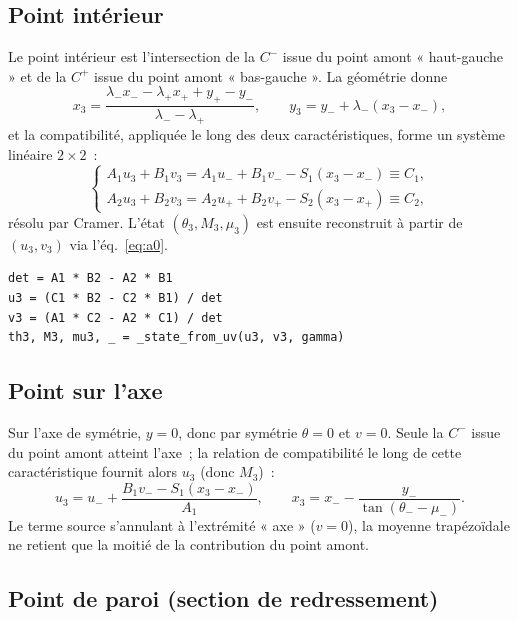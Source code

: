 \documentclass[11pt,a4paper]{article}
\begin{document}
\subsection{Point intérieur}

Le point intérieur est l'intersection de la $C^{-}$ issue du point amont
« haut-gauche » et de la $C^{+}$ issue du point amont « bas-gauche ». La
géométrie donne
\begin{equation}
  x_3 = \frac{\lambda_{-} x_{-} - \lambda_{+} x_{+} + y_{+} - y_{-}}
             {\lambda_{-} - \lambda_{+}},
  \qquad
  y_3 = y_{-} + \lambda_{-}(x_3 - x_{-}),
\end{equation}
et la compatibilité, appliquée le long des deux caractéristiques, forme un
système linéaire $2\times2$~:
\begin{equation}
  \begin{cases}
    A_1 u_3 + B_1 v_3 = A_1 u_{-} + B_1 v_{-} - S_1 (x_3 - x_{-}) \equiv C_1,\\
    A_2 u_3 + B_2 v_3 = A_2 u_{+} + B_2 v_{+} - S_2 (x_3 - x_{+}) \equiv C_2,
  \end{cases}
\end{equation}
résolu par Cramer. L'état $(\theta_3,M_3,\mu_3)$ est ensuite reconstruit à
partir de $(u_3,v_3)$ via l'éq.~\eqref{eq:a0}.

\begin{lstlisting}[style=py,caption={Boucle prédicteur-correcteur du point intérieur.}]
det = A1 * B2 - A2 * B1
u3 = (C1 * B2 - C2 * B1) / det
v3 = (A1 * C2 - A2 * C1) / det
th3, M3, mu3, _ = _state_from_uv(u3, v3, gamma)
\end{lstlisting}

\subsection{Point sur l'axe}

Sur l'axe de symétrie, $y=0$, donc par symétrie $\theta = 0$ et $v = 0$. Seule
la $C^{-}$ issue du point amont atteint l'axe~; la relation de compatibilité le
long de cette caractéristique fournit alors $u_3$ (donc $M_3$)~:
\begin{equation}
  u_3 = u_{-} + \frac{B_1 v_{-} - S_1 (x_3 - x_{-})}{A_1},
  \qquad
  x_3 = x_{-} - \frac{y_{-}}{\tan(\theta_{-}-\mu_{-})}.
\end{equation}
Le terme source s'annulant à l'extrémité « axe » ($v=0$), la moyenne
trapézoïdale ne retient que la moitié de la contribution du point amont.

\subsection{Point de paroi (section de redressement)}
\end{document}
